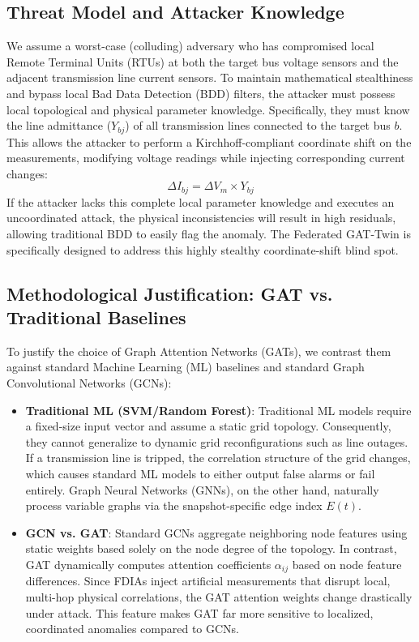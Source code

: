 \documentclass[10pt, a4paper, twocolumn]{article}
\begin{document}
\subsection{Threat Model and Attacker Knowledge}
We assume a worst-case (colluding) adversary who has compromised local Remote Terminal Units (RTUs) at both the target bus voltage sensors and the adjacent transmission line current sensors. To maintain mathematical stealthiness and bypass local Bad Data Detection (BDD) filters, the attacker must possess local topological and physical parameter knowledge. Specifically, they must know the line admittance ($Y_{bj}$) of all transmission lines connected to the target bus $b$. This allows the attacker to perform a Kirchhoff-compliant coordinate shift on the measurements, modifying voltage readings while injecting corresponding current changes:
\begin{equation}
\Delta I_{bj} = \Delta V_m \times Y_{bj}
\end{equation}
If the attacker lacks this complete local parameter knowledge and executes an uncoordinated attack, the physical inconsistencies will result in high residuals, allowing traditional BDD to easily flag the anomaly. The Federated GAT-Twin is specifically designed to address this highly stealthy coordinate-shift blind spot.

\subsection{Methodological Justification: GAT vs. Traditional Baselines}
To justify the choice of Graph Attention Networks (GATs), we contrast them against standard Machine Learning (ML) baselines and standard Graph Convolutional Networks (GCNs):
\begin{itemize}
    \item \textbf{Traditional ML (SVM/Random Forest)}: Traditional ML models require a fixed-size input vector and assume a static grid topology. Consequently, they cannot generalize to dynamic grid reconfigurations such as line outages. If a transmission line is tripped, the correlation structure of the grid changes, which causes standard ML models to either output false alarms or fail entirely. Graph Neural Networks (GNNs), on the other hand, naturally process variable graphs via the snapshot-specific edge index $E(t)$.
    \item \textbf{GCN vs. GAT}: Standard GCNs aggregate neighboring node features using static weights based solely on the node degree of the topology. In contrast, GAT dynamically computes attention coefficients $\alpha_{ij}$ based on node feature differences. Since FDIAs inject artificial measurements that disrupt local, multi-hop physical correlations, the GAT attention weights change drastically under attack. This feature makes GAT far more sensitive to localized, coordinated anomalies compared to GCNs.
\end{itemize}
\end{document}

